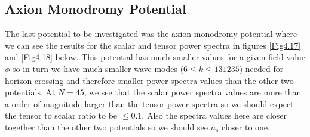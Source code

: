 \documentclass[a4paper,12pt,twoside]{report}
\begin{document}
\subsection{Axion Monodromy Potential} \label{subsec:Res_Pert_Axion}

The last potential to be investigated was the axion monodromy potential where we can see the results for the scalar and tensor power spectra in figures \ref{Fig4.17} and \ref{Fig4.18} below. This potential has much smaller values for a given field value $\phi$ so in turn we have much smaller wave-modes ($6 \le k \le 131235$) needed for horizon crossing and therefore smaller power spectra values than the other two potentials. At $N = 45$, we see that the scalar power spectra values are more than a order of magnitude larger than the tensor power spectra so we should expect the tensor to scalar ratio to be $\le 0.1$. Also the spectra values here are closer together than the other two potentials so we should see $n_{s}$ closer to one.

\noindent%
\begin{minipage}{\linewidth}%
\label{Fig4.17}
\end{minipage}
\end{document}
